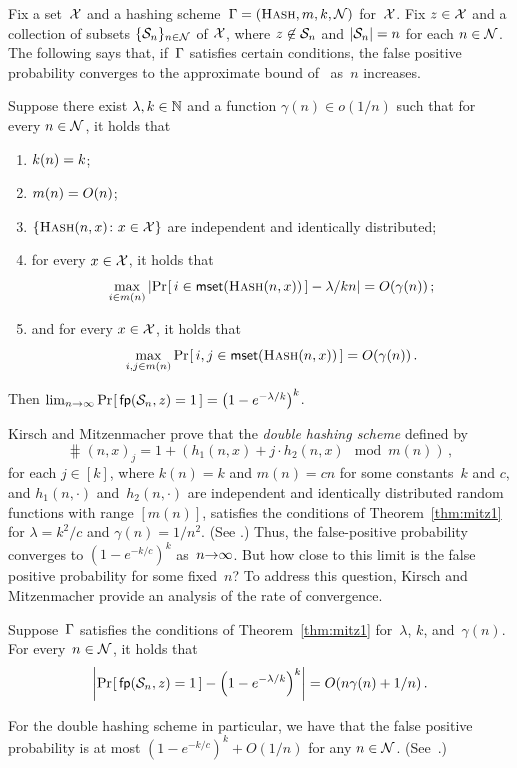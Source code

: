Fix a set~$\mathcal{X}$ and a hashing scheme~$\mathrm{\Gamma} = (\textsc{Hash}, m, k,
\mathcal{N})$ for~$\mathcal{X}$.  Fix $z\in\mathcal{X}$ and a collection of subsets $\{ \mathcal{S}_n
\}_{n\in\mathcal{N}}$ of $\mathcal{X}$, where $z\not\in\mathcal{S}_n$ and $|\mathcal{S}_n| = n$
for each $n \in \mathcal{N}$.
%
The following says that, if~$\mathrm{\Gamma}$ satisfies certain conditions, the
false positive probability converges to the approximate bound
of~\cite{broder2004network} as~$n$ increases.
%
\begin{theorem}
  \label{thm:mitz1}
  Suppose there exist $\lambda, k\in\mathbb{N}$ and a function $\gamma(n) \in o(1/n)$ such
  that for every $n \in \mathcal{N}$, it holds that
  \begin{enumerate}
    \item $k(n) = k$;
    \item $m(n) = O(n)$;
    \item $\{\textsc{Hash}(n, x)\colon x\in\mathcal{X}\}$ are independent and
      identically distributed;

    \item for every $x \in \mathcal{X}$, it holds that
      \[
        \max_{i\in m(n)} \left|
          \Pr\hspace{-1pt}\left[\, i \in \mathsf{mset}(\textsc{Hash}(n, x)) \,\right] - \lambda/kn
        \right| = O(\gamma(n)) \,;
      \]

    \item and for every $x \in \mathcal{X}$, it holds that
      \[
        \max_{i,j\in m(n)}
          \Pr\hspace{-1pt}\left[\, i,j \in \mathsf{mset}(\textsc{Hash}(n, x)) \,\right] = O(\gamma(n)) \,.
      \]
  \end{enumerate}
  Then $\lim_{n{\rightarrow}\infty} \Pr\hspace{-1pt}\left[\,\mathsf{fp}(\mathcal{S}_n,z)=1\,\right] = \left(1 -
  e^{-\lambda/k}\right)^k$.
\end{theorem}
%
Kirsch and Mitzenmacher prove that the \emph{double hashing scheme} defined by
\[
  \hash(n,x)_j = 1 + (h_1(n,x) + j\cdot h_2(n,x) \mod m(n)) \,,
\]
for each $j\in[k]$, where $k(n)=k$ and $m(n)=cn$ for some constants~$k$ and $c$, and
$h_1(n,\cdot)$ and~$h_2(n,\cdot)$ are independent and identically distributed
random functions with range $[m(n)]$, satisfies the conditions of
Theorem~\ref{thm:mitz1} for $\lambda = k^2/c$ and $\gamma(n) = 1/n^2$. (See
\cite[Thorem 5.2]{kirsch2006less}.) Thus, the false-positive probability
converges to $(1-e^{-k/c})^k$ as~$n{\rightarrow}\infty$.
%
But how close to this limit is the false positive probability for some
fixed~$n$? To address this question, Kirsch and Mitzenmacher provide an analysis
of the rate of convergence.
%
\begin{theorem}\label{thm:mitz2}
  Suppose~$\mathrm{\Gamma}$ satisfies the conditions of Theorem~\ref{thm:mitz1}
  for~$\lambda$, $k$, and~$\gamma(n)$. For every~$n\in\mathcal{N}$, it holds that
  \[
    \left|
      \Pr\hspace{-1pt}\left[\,\mathsf{fp}(\mathcal{S}_n,z)=1\,\right] - \left(1 - e^{-\lambda/k}\right)^k
    \right| = O(n\gamma(n) + 1/n) \,.
  \]
\end{theorem}
%
For the double hashing scheme in particular, we have that the false positive
probability is at most
$
  (1 - e^{-k/c})^k + O(1/n)
$
for any $n\in\mathcal{N}$. (See~\cite[Theorem 6.2]{kirsch2006less}.)

